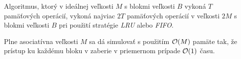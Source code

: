 \begin{lema}
Algoritmus, ktorý v ideálnej \cache veľkosti $M$ s blokmi veľkosti $B$ vykoná $T$ pamäťových operácií, vykoná najviac $2T$ pamäťových operácií v \cache veľkosti $2M$ s blokmi veľkosti $B$ pri použití stratégie \emph{LRU} alebo \emph{FIFO}. \citep[Lemma 12]{frigo1999cache}
\end{lema}

\begin{lema}
Plne asociatívna \cache veľkosti $M$ sa dá simulovať s použitím $\mathcal{O}(M)$ pamäte tak, že prístup ku každému bloku v \cache zaberie v priemernom prípade $\mathcal{O}(1)$ času. \citep[Lemma 16]{frigo1999cache}
\end{lema}